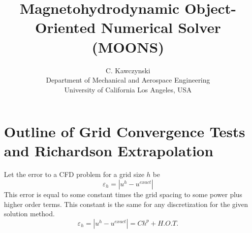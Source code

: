 \documentclass[11pt]{article}
\begin{document}
\doublespacing
\title{Magnetohydrodynamic Object-Oriented Numerical Solver (MOONS)}
\author{C. Kawczynski \\
Department of Mechanical and Aerospace Engineering \\
University of California Los Angeles, USA\\
}
\maketitle

\section{Outline of Grid Convergence Tests and Richardson Extrapolation}
Let the error to a CFD problem for a grid size $h$ be
\begin{equation}
	\varepsilon_{h} = |u^{h} - u^{exact}|
\end{equation}
This error is equal to some constant times the grid spacing to some power plus higher order terms. This constant is the same for any discretization for the given solution method.
\begin{equation}
	\varepsilon_{h}
	=
	|u^{h} - u^{exact}|
	=
	C h^p + H.O.T.
\end{equation}
\end{document}
